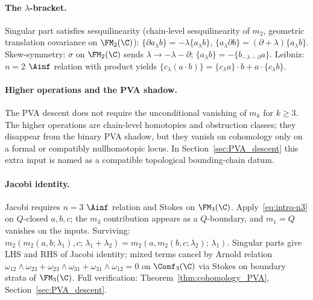 \paragraph{The $\lambda$-bracket.}
Singular part satisfies sesquilinearity (chain-level
sesquilinearity of $m_2$, geometric translation covariance on
$\FM_2(\C)$): $\{\partial a {}_\lambda b\} = -\lambda \{a {}_\lambda b\}$,
$\{a {}_\lambda \partial b\} = (\partial + \lambda)\{a {}_\lambda b\}$.
Skew-symmetry: $\sigma$ on $\FM_2(\C)$ sends
$\lambda \to -\lambda - \partial$;
$\{a {}_\lambda b\} = -\{b {}_{-\lambda - \partial} a\}$.
Leibniz: $n = 2$ $\Ainf$ relation with product yields
$\{c {}_\lambda (a \cdot b)\} = \{c {}_\lambda a\} \cdot b +
a \cdot \{c {}_\lambda b\}$.

\paragraph{Higher operations and the PVA shadow.}
The PVA descent does not require the unconditional vanishing of
$m_k$ for $k\ge3$. The higher operations are chain-level homotopies
and obstruction classes; they disappear from the binary PVA shadow,
but they vanish on cohomology only on a formal or compatibly
nullhomotopic locus. In Section~\ref{sec:PVA_descent} this extra
input is named as a compatible topological bounding-chain datum.

\paragraph{Jacobi identity.}
Jacobi requires $n = 3$ $\Ainf$ relation and Stokes on
$\FM_3(\C)$. Apply~\eqref{eq:intro-n3} on $Q$-closed $a, b, c$;
the $m_3$ contribution appears as a $Q$-boundary, and $m_1 = Q$
vanishes on the inputs. Surviving:
$m_2(m_2(a,b;\lambda_1), c;\, \lambda_1 + \lambda_2) =
m_2(a, m_2(b,c;\lambda_2);\, \lambda_1)$. Singular parts give
LHS and RHS of Jacobi identity; mixed terms cancel by Arnold
relation $\omega_{12}\wedge\omega_{23} + \omega_{23}\wedge\omega_{31}
+ \omega_{31}\wedge\omega_{12} = 0$ on $\Conf_3(\C)$ via Stokes
on boundary strata of $\FM_3(\C)$. Full verification:
Theorem~\ref{thm:cohomology_PVA}, Section~\ref{sec:PVA_descent}.

